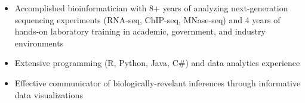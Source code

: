 

\begin{resentries}

\vspace{-2mm}

\begin{itemize}[leftmargin=*]
	\setlength{\itemsep}{-1.5mm}
	\item{Accomplished bioinformatician with 8+ years of analyzing next-generation sequencing experiments (RNA-seq, ChIP-seq, MNase-seq) and 4 years of hands-on laboratory training in academic, government, and industry environments}
	\item{Extensive programming (R, Python, Java, C\#) and data analytics experience}
	\item{Effective communicator of biologically-revelant inferences through informative data visualizations}

\end{itemize}

\end{resentries}
